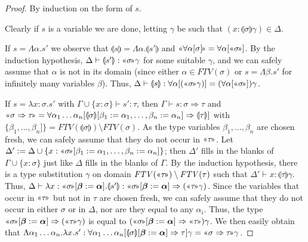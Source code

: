 \documentclass[runningheads,a4paper]{llncs}
\newcommand{\quant}[2]{\forall #1[#2]}
\newcommand{\typeinterpret}[1]{\text{\guillemotleft} #1\! \text{\guillemotright}}
\newcommand{\interpret}[1]{\llparenthesis #1 \rrparenthesis}
\newcommand{\arrtype}{\Rightarrow}
\newcommand{\abs}[2]{\lambda #1.#2}
\newcommand{\tabs}[2]{\Lambda #1.#2}
\newcommand{\FTV}{\mathit{FTV}}
\begin{document}
\begin{proof}
By induction on the form of $s$.

Clearly if $s$ is a variable we are done, letting $\gamma$ be such that
$(x : \interpret{\sigma}\gamma) \in \Delta$.

If $s = \tabs{\alpha}{s'}$ we observe that $\interpret{s} = \tabs{
\alpha}{\interpret{s'}}$ and $\typeinterpret{\quant{\alpha}{\sigma}} =
\quant{\alpha}{\typeinterpret{\sigma}}$.
By the induction hypothesis, $\Delta \vdash \interpret{s'} :
\typeinterpret{\sigma}\gamma$ for some suitable $\gamma$, and we can
safely assume that $\alpha$ is not in its domain (since either
$\alpha \in \FTV(\sigma)$ or $s = \tabs{\beta}{s'}$ for infinitely
many variables $\beta$).  Thus, $\Delta \vdash \interpret{s} :
\quant{\alpha}{(\typeinterpret{\sigma}\gamma)} =
(\quant{\alpha}{\typeinterpret{\sigma}})\gamma$.

If $s = \abs{x:\sigma}{s'}$ with $\Gamma \cup \{ x : \sigma \} \vdash
s' : \tau$, then $\Gamma \vdash s : \sigma \arrtype \tau$ and
$\typeinterpret{\sigma \arrtype \tau} = \quant{\alpha_1 \dots \alpha_n}{
\interpret{\sigma}[\beta_1:=\alpha_1,\dots,\beta_n:=\alpha_n] \arrtype
\interpret{\tau}}$ with $\{\beta_1,\dots,\beta_n]\} = \FTV(\interpret{
\sigma}) \setminus \FTV(\sigma)$.  As the type variables $\beta_1,
\dots,\beta_n$ are chosen fresh, we can safely assume that they do not
occur in $\typeinterpret{\tau}$.
Let $\Delta' := \Delta \cup \{ x : \typeinterpret{\sigma}[\beta_1:=
\alpha_1,\dots,\beta_n:=\alpha_n] \}$; then $\Delta'$ fills in the
blanks of $\Gamma \cup \{ x : \sigma \}$ just like $\Delta$ fills in the
blanks of $\Gamma$.  By the induction hypothesis, there is a type
substitution $\gamma$ on domain $\FTV(\typeinterpret{\tau}) \setminus
\FTV(\tau)$ such that $\Delta' \vdash x : \interpret{\tau}\gamma$.
Thus, $\Delta \vdash \abs{x:\typeinterpret{\sigma}[\vec{\beta}:=
\vec{\alpha}]}{\interpret{s'}} : \typeinterpret{\sigma}[\vec{\beta}:=
\vec{\alpha}] \arrtype (\typeinterpret{\tau}\gamma)$.
Since the variables that occur in $\typeinterpret{\tau}$ but not in
$\tau$ are chosen fresh, we can safely assume that they do not occur in
either $\sigma$ or in $\Delta$, nor are they equal to any $\alpha_i$.
Thus, the type $\typeinterpret{\sigma}[\vec{\beta}:=\vec{\alpha}]
\arrtype (\typeinterpret{\tau}\gamma)$ is equal to
$(\typeinterpret{\sigma}[\vec{\beta}:=\vec{\alpha}] \arrtype
\typeinterpret{\tau})\gamma$.
We then easily obtain that $\tabs{\alpha_1 \dots \alpha_n}{\abs{x}{s'}} :
\quant{\alpha_1 \dots \alpha_n}{\interpret{\sigma}[\vec{\beta}:=\vec{
\alpha}] \arrtype \tau}\gamma = \typeinterpret{\sigma \arrtype \tau}
\gamma$.


\end{proof}
\end{document}
